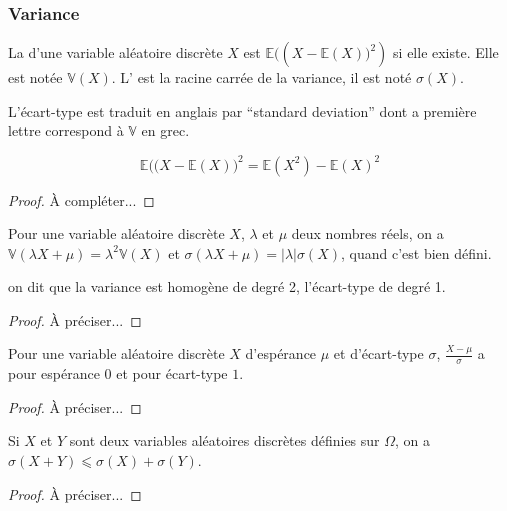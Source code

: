 \subsubsection{Variance}
\begin{definition}
La  d'une variable aléatoire discrète \(𝑋\) est \(𝔼\bigl((𝑋-𝔼(𝑋)\bigr)^2)\) si elle existe.
Elle est notée \(𝕍(𝑋)\). L' est la racine carrée de la variance, il est noté
\(σ(𝑋)\).
\end{definition}
\begin{remark}
L'écart-type est traduit en anglais par ``standard deviation'' dont a première lettre correspond à \(𝕍\) en grec.
\end{remark}
\begin{theorem}
[de König]
\begin{equation*}
𝔼\bigl((𝑋-𝔼(𝑋)\bigr)^2=𝔼(𝑋^2)-𝔼(𝑋)^2
\end{equation*}
\end{theorem}
\begin{proof}
À compléter...
\end{proof}
\begin{theorem}
[Homogénéité]
Pour une variable aléatoire discrète \(𝑋\), \(𝜆\) et \(𝜇\) deux nombres réels, on a
\(𝕍(𝜆𝑋+𝜇)=𝜆^2𝕍(𝑋)\) et \(σ(𝜆𝑋+𝜇)=|𝜆|σ(𝑋)\), quand c'est bien défini.
\end{theorem}
\begin{remark}
 on dit que la variance est homogène de degré 2, l'écart-type de degré 1.
\end{remark}
\begin{proof}
À préciser...
\end{proof}
\begin{theorem}
[Normalisation]
Pour une variable aléatoire discrète \(𝑋\) d'espérance \(𝜇\) et d'écart-type \(𝜎\), \(\frac{𝑋-𝜇} 𝜎\) a pour
espérance \(0\) et pour écart-type \(1\).
\end{theorem}
\begin{proof}
À préciser...
\end{proof}
\begin{theorem}
Si \(𝑋\) et \(𝑌\) sont deux variables aléatoires discrètes définies sur \(Ω\), on a
\(σ(𝑋+𝑌)⩽σ(𝑋)+σ(𝑌)\).
\end{theorem}
\begin{proof}
À préciser...
\end{proof}
